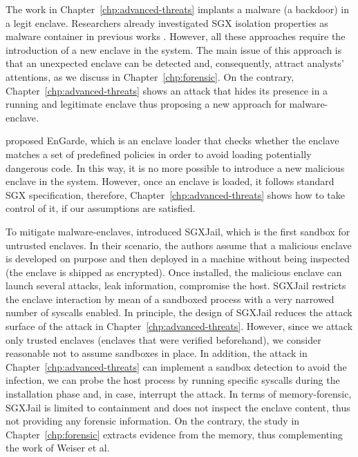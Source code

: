 The work in Chapter~\ref{chp:advanced-threats} implants a malware (\ie a 
backdoor) in a legit enclave.
Researchers already investigated SGX isolation properties as malware container
in previous
works 
\citep{thoughs-on-intel1,thoughs-on-intel2,davenport2014sgx,amsterdamsgxmalwer,schwarz2017malware,schwarz2018good,sgxrop}.
However, all these approaches require the introduction of a new enclave in the 
system.
The main issue of this approach is that an unexpected enclave can be detected
and, consequently, attract analysts' attentions, as we discuss in 
Chapter~\ref{chp:forensic}.
On the contrary, Chapter~\ref{chp:advanced-threats} shows an attack that hides 
its presence in a running and legitimate enclave thus proposing a new approach 
for malware-enclave.

\cite{7980210} proposed EnGarde, which is an enclave loader that checks whether 
the enclave matches a set of predefined policies in order to avoid loading 
potentially dangerous code.
In this way, it is no more possible to introduce a new malicious enclave in the 
system.
However, once an enclave is loaded, it follows standard SGX specification, 
therefore, Chapter~\ref{chp:advanced-threats} shows how to take control of it, 
if our assumptions are satisfied.

To mitigate malware-enclaves, \cite{sgxjail} introduced 
SGXJail, which is the first sandbox for untrusted enclaves.
In their scenario, the authors assume that a malicious enclave is developed on 
purpose and then deployed in a machine without being inspected (\eg the enclave 
is shipped as encrypted).
Once installed, the malicious enclave can launch several attacks, \eg leak 
information, compromise the host.
SGXJail restricts the enclave interaction by mean of a sandboxed process with 
a very narrowed number of syscalls enabled.
In principle, the design of SGXJail reduces the attack surface of the attack in 
Chapter~\ref{chp:advanced-threats}.
However, since we attack only trusted enclaves (\ie enclaves that were 
verified beforehand), we consider reasonable not to assume sandboxes in place.
In addition, the attack in Chapter~\ref{chp:advanced-threats} can implement a 
sandbox detection to avoid the infection, \ie we can probe the host process by 
running specific syscalls during the installation phase and, in case, interrupt 
the attack.
In terms of memory-forensic, SGXJail is limited to containment and does not 
inspect the enclave content, thus not providing any forensic information.
On the contrary, the study in Chapter~\ref{chp:forensic} extracts evidence from 
the memory, thus complementing the work of Weiser et al.

